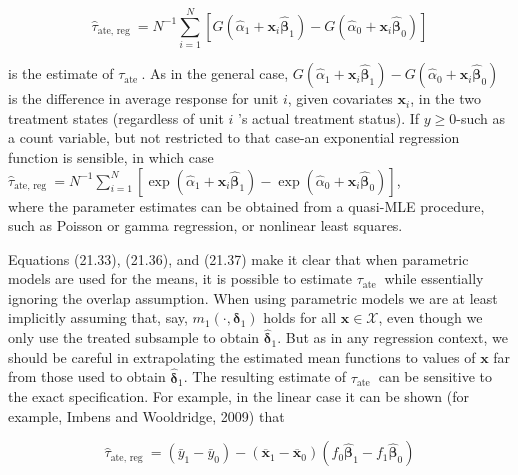 \documentclass[10pt]{article}
\begin{document}
\begin{equation*}
\hat{\tau}_{\text {ate, reg }}=N^{-1} \sum_{i=1}^{N}\left[G\left(\hat{\alpha}_{1}+\mathbf{x}_{i} \hat{\boldsymbol{\beta}}_{1}\right)-G\left(\hat{\alpha}_{0}+\mathbf{x}_{i} \hat{\boldsymbol{\beta}}_{0}\right)\right] \tag{21.36}
\end{equation*}


is the estimate of $\tau_{\text {ate }}$. As in the general case, $G\left(\hat{\alpha}_{1}+\mathbf{x}_{i} \hat{\boldsymbol{\beta}}_{1}\right)-G\left(\hat{\alpha}_{0}+\mathbf{x}_{i} \hat{\boldsymbol{\beta}}_{0}\right)$ is the difference in average response for unit $i$, given covariates $\mathbf{x}_{i}$, in the two treatment states (regardless of unit $i$ 's actual treatment status). If $y \geq 0$-such as a count variable, but not restricted to that case-an exponential regression function is sensible, in which case\\
$\hat{\tau}_{\text {ate, reg }}=N^{-1} \sum_{i=1}^{N}\left[\exp \left(\hat{\alpha}_{1}+\mathbf{x}_{i} \hat{\boldsymbol{\beta}}_{1}\right)-\exp \left(\hat{\alpha}_{0}+\mathbf{x}_{i} \hat{\boldsymbol{\beta}}_{0}\right)\right]$,\\
where the parameter estimates can be obtained from a quasi-MLE procedure, such as Poisson or gamma regression, or nonlinear least squares.

Equations (21.33), (21.36), and (21.37) make it clear that when parametric models are used for the means, it is possible to estimate $\tau_{\text {ate }}$ while essentially ignoring the overlap assumption. When using parametric models we are at least implicitly assuming that, say, $m_{1}\left(\cdot, \boldsymbol{\delta}_{1}\right)$ holds for all $\mathbf{x} \in \mathscr{X}$, even though we only use the treated subsample to obtain $\hat{\boldsymbol{\delta}}_{1}$. But as in any regression context, we should be careful in extrapolating the estimated mean functions to values of $\mathbf{x}$ far from those used to obtain $\hat{\boldsymbol{\delta}}_{1}$. The resulting estimate of $\tau_{\text {ate }}$ can be sensitive to the exact specification. For example, in the linear case it can be shown (for example, Imbens and Wooldridge, 2009) that


\begin{equation*}
\hat{\tau}_{\text {ate, reg }}=\left(\bar{y}_{1}-\bar{y}_{0}\right)-\left(\overline{\mathbf{x}}_{1}-\overline{\mathbf{x}}_{0}\right)\left(f_{0} \hat{\boldsymbol{\beta}}_{1}-f_{1} \hat{\boldsymbol{\beta}}_{0}\right) \tag{21.38}
\end{equation*}
\end{document}
